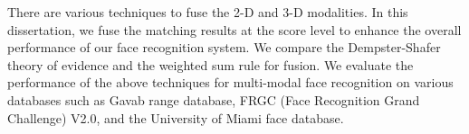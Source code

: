 {There are various techniques to fuse the 2-D and 3-D modalities. In
this dissertation, we fuse the matching results at the score level
to enhance the overall performance of our face recognition system.
We compare the Dempster-Shafer theory of evidence and the weighted
sum rule for fusion. We evaluate the performance of the above
techniques for multi-modal face recognition on various databases
such as Gavab range database, FRGC (Face Recognition Grand
Challenge) V2.0, and the University of Miami face database.}
